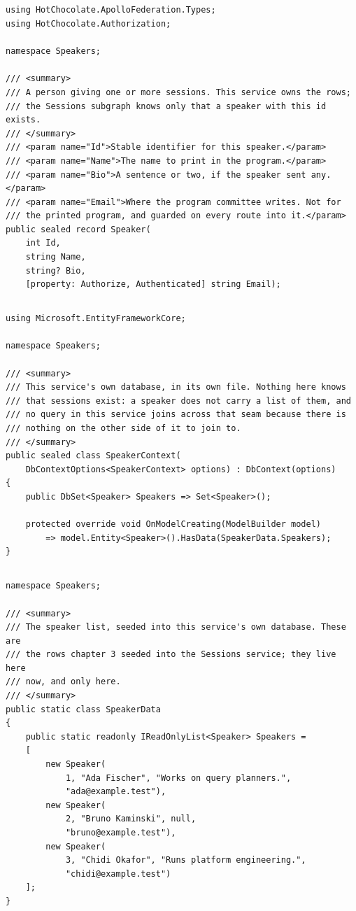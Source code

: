 \subsection*{}
\begin{verbatim}
using HotChocolate.ApolloFederation.Types;
using HotChocolate.Authorization;

namespace Speakers;

/// <summary>
/// A person giving one or more sessions. This service owns the rows;
/// the Sessions subgraph knows only that a speaker with this id exists.
/// </summary>
/// <param name="Id">Stable identifier for this speaker.</param>
/// <param name="Name">The name to print in the program.</param>
/// <param name="Bio">A sentence or two, if the speaker sent any.</param>
/// <param name="Email">Where the program committee writes. Not for
/// the printed program, and guarded on every route into it.</param>
public sealed record Speaker(
    int Id,
    string Name,
    string? Bio,
    [property: Authorize, Authenticated] string Email);
\end{verbatim}

\subsection*{}
\begin{verbatim}
using Microsoft.EntityFrameworkCore;

namespace Speakers;

/// <summary>
/// This service's own database, in its own file. Nothing here knows
/// that sessions exist: a speaker does not carry a list of them, and
/// no query in this service joins across that seam because there is
/// nothing on the other side of it to join to.
/// </summary>
public sealed class SpeakerContext(
    DbContextOptions<SpeakerContext> options) : DbContext(options)
{
    public DbSet<Speaker> Speakers => Set<Speaker>();

    protected override void OnModelCreating(ModelBuilder model)
        => model.Entity<Speaker>().HasData(SpeakerData.Speakers);
}
\end{verbatim}

\subsection*{}
\begin{verbatim}
namespace Speakers;

/// <summary>
/// The speaker list, seeded into this service's own database. These are
/// the rows chapter 3 seeded into the Sessions service; they live here
/// now, and only here.
/// </summary>
public static class SpeakerData
{
    public static readonly IReadOnlyList<Speaker> Speakers =
    [
        new Speaker(
            1, "Ada Fischer", "Works on query planners.",
            "ada@example.test"),
        new Speaker(
            2, "Bruno Kaminski", null,
            "bruno@example.test"),
        new Speaker(
            3, "Chidi Okafor", "Runs platform engineering.",
            "chidi@example.test")
    ];
}
\end{verbatim}

